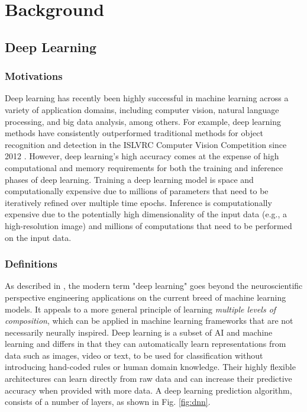 \chapter{Background} \label{chap:background}

\section{Deep Learning} \label{sec:deeplearning}
\subsection{Motivations}
Deep learning has recently been highly successful in machine learning across a variety of application domains, including computer vision, natural language processing, and big data analysis, among others. For example, deep learning methods have consistently outperformed traditional methods for object recognition and detection in the ISLVRC Computer Vision Competition since 2012 \cite{ILSVRC15}. However, deep learning’s high accuracy comes at the expense of high computational and memory requirements for both the training and inference phases of deep learning. Training a deep learning model is space and computationally expensive due to millions of parameters that need to be iteratively refined over multiple time epochs. Inference is computationally expensive due to the potentially high dimensionality of the input data (e.g., a high-resolution image) and millions of computations that need to be performed on the input data.

\subsection{Definitions}
As described in \cite{Goodfellow-et-al-2016}, the modern term "deep learning" goes beyond the neuroscientific perspective engineering applications on the current breed of machine learning models. It appeals to a more general principle of learning \textit{multiple levels of composition}, which can be applied in machine learning frameworks that are not necessarily neurally inspired. Deep learning is a subset of AI and machine learning and differs in that they can automatically learn representations from data such as images, video or text, to be used for classification without introducing hand-coded rules or human domain knowledge. Their highly flexible architectures can learn directly from raw data and can increase their predictive accuracy when provided with more data.
A deep learning prediction algorithm, consists of a number of layers, as shown in Fig. \ref{fig:dnn}.

